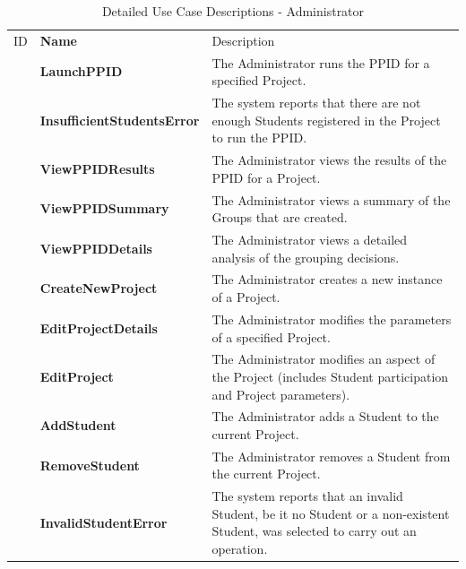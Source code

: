 \documentclass[12pt,letterpaper]{article}
\begin{document}
\begin{table}[H]
	\caption{Detailed Use Case Descriptions - Administrator}
	\vspace{1em}
	\begin{tabu} to 
	    \tableheader{}ID & Name & Description\\
		\launchppid{} & LaunchPPID & The Administrator runs the PPID for a specified Project.\\
		\insufficientstudentserror{} & InsufficientStudentsError & The system reports that there are not enough Students registered in the Project to run the PPID.\\
		\viewppidresults{} & ViewPPIDResults & The Administrator views the results of the PPID for a Project.\\
		\viewppidsummary{} & ViewPPIDSummary & The Administrator views a summary of the Groups that are created.\\
		\viewppiddetails{} & ViewPPIDDetails & The Administrator views a detailed analysis of the grouping decisions.\\
		\createnewproject{} & CreateNewProject & The Administrator creates a new instance of a Project.\\
		\editprojectdetails{} & EditProjectDetails & The Administrator modifies the parameters of a specified Project.\\
		\editproject{} & EditProject & The Administrator modifies an aspect of the Project (includes Student participation and Project parameters).\\
		\addstudent{} & AddStudent & The Administrator adds a Student to the current Project.\\
		\removestudent{} & RemoveStudent & The Administrator removes a Student from the current Project.\\
		\invalidstudenterror{} & InvalidStudentError & The system reports that an invalid Student, be it no Student or a non-existent Student, was selected to carry out an operation.\\
	\end{tabu}
\end{table}
\end{document}
